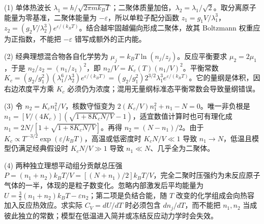 (1) 单体热波长 \(\lambda_1=h/\sqrt{2\pi mk_BT}\)；二聚体质量加倍，\(\lambda_2=\lambda_1/\sqrt2\)。取分离原子能量为零基准，二聚体能量为 \(-\varepsilon\)，所以单粒子配分函数 \(z_1=g_1V/\lambda_1^3\)，\(z_2=(g_2V/\lambda_2^3)e^{\varepsilon/(k_BT)}\)。结合越牢固越偏向形成二聚体，故其 Boltzmann 权重应为正指数，不能把 \(-\varepsilon\) 错写成额外的正内能。

(2) 经典理想混合物各自化学势为 \(\mu_j=k_BT\ln(n_j/z_j)\)。反应平衡要求 \(\mu_2=2\mu_1\)，于是 \(n_2/z_2=(n_1/z_1)^2\)，即 \(n_2/V=K_c(T)(n_1/V)^2\)。平衡常数 \(K_c=(g_2/g_1^2)(\lambda_1^6/\lambda_2^3)e^{\varepsilon/(k_BT)}=(g_2/g_1^2)2^{3/2}\lambda_1^3e^{\varepsilon/(k_BT)}\)。它的量纲是体积，因右边浓度平方乘 \(K_c\) 必须仍为浓度；混用无量纲标准态平衡常数会导致量纲错误。

(3) 令 \(n_2=K_cn_1^2/V\)，核数守恒变为 \(2(K_c/V)n_1^2+n_1-N=0\)。唯一非负根是 \(n_1=[V/(4K_c)](\sqrt{1+8K_cN/V}-1)\)，适宜数值计算时也可有理化成 \(n_1=2N/[1+\sqrt{1+8K_cN/V}]\)。再得 \(n_2=(N-n_1)/2\)。由于 \(K_c\propto T^{-3/2}\exp(\varepsilon/k_BT)\)，高温或低密度时 \(K_cN/V\ll1\) 导致 \(n_1\to N\)，低温且模型仍满足经典假设时 \(K_cN/V\gg1\) 导致 \(n_1\ll N\)、几乎全为二聚体。

(4) 两种独立理想平动组分贡献总压强 \(P=(n_1+n_2)k_BT/V=[(N+n_1)/2]k_BT/V\)，完全二聚时压强约为未反应原子气体的一半，体现的是粒子数变化。忽略内部激发后平均能量为 \(U=\frac32(n_1+n_2)k_BT-\varepsilon n_2\)；第二项是负结合能，随 \(T\) 改变的化学组成会向热容加入反应热效应。求实际 \(C_V=dU/dT\) 时必须包含 \(dn_j/dT\)，而不能把 \(n_1,n_2\) 当成彼此独立的常数；模型在低温进入简并或冻结反应动力学时会失效。
